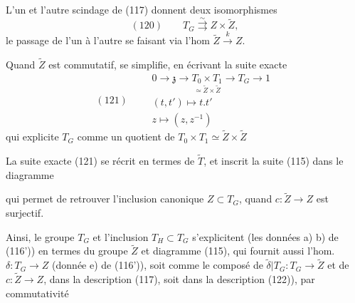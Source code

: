\documentclass[11pt,a4paper]{article}
\begin{document}
L'un et l'autre scindage de (117) donnent deux isomorphismes
\[
(120)\qquad T_G \overset{\sim}{\rightrightarrows} Z\times\widetilde{Z} ,
\]
le passage de l'un à l'autre se faisant via l'hom $\widetilde{Z} \xrightarrow{\;k\;} Z$.

Quand $\widetilde{Z}$ est commutatif,  se simplifie, en écrivant la suite
exacte
\[
(121)\qquad
\begin{gathered}
0 \longrightarrow \mathfrak{z} \longrightarrow
\underset{\simeq\widetilde{Z}\times\widetilde{Z}}{T_0\times T_1}
\longrightarrow T_G \longrightarrow 1\\
(t,t') \longmapsto t.t' \\
z \longmapsto (z, z^{-1})
\end{gathered}
\]
qui explicite $T_G$ comme un quotient de $T_0\times T_1 \simeq \widetilde{Z}\times\widetilde{Z}$


   

La suite exacte (121) se récrit en termes de $\widetilde{T}$, et inscrit la suite (115) dans le
diagramme




qui permet de retrouver l'inclusion canonique $Z\subset T_G$, quand $c : \widetilde{Z}\to Z$
est surjectif.

Ainsi, le groupe $T_G$ et l'inclusion $T_H\subset T_G$ s'explicitent (les données a) b) de
(116')) en termes du groupe $\widetilde{Z}$ et 
diagramme (115), qui fournit aussi l'hom. $\delta : T_G\to Z$ (donnée e) de (116')), soit
comme le composé de $\widetilde{\delta}\vert T_G : T_G\to\widetilde{Z}$ et de $c : \widetilde{Z}\to Z$, dans la \struck{\ill{}} description (117), soit dans la description
(122)), par commutativité 
\end{document}
